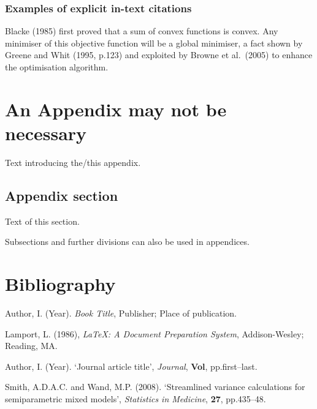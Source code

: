 \documentclass[a4paper, 12pt, notitlepage]{report}
\begin{document}
	\subsection{Examples of explicit in-text citations}
	Blacke (1985) first proved that a sum of convex functions is convex. Any minimiser of this objective function will be a global minimiser, a fact shown by Greene and Whit (1995, p.123) and exploited by Browne et al.\ (2005) to enhance the optimisation algorithm.
	
	\appendix
	\chapter{An Appendix may not be necessary}
	Text introducing the/this appendix.
	
	\section{Appendix section}
	Text of this section.
	
	Subsections and further divisions can also be used in appendices.
	
	\chapter*{Bibliography}
	\begin{description}
		
		\item Author, I. (Year). \emph{Book Title}, Publisher; Place of publication.
		
		\item Lamport, L. (1986), \emph{\LaTeX: A Document Preparation System}, Addison-Wesley; Reading, MA.
		
		\item Author, I. (Year). `Journal article title', \emph{Journal}, \textbf{Vol}, pp.first--last.
		
		\item Smith, A.D.A.C. and Wand, M.P. (2008). `Streamlined variance calculations for semiparametric
		mixed models', \emph{Statistics in Medicine}, \textbf{27}, pp.435--48.
		
	\end{description}
	
\end{document}
